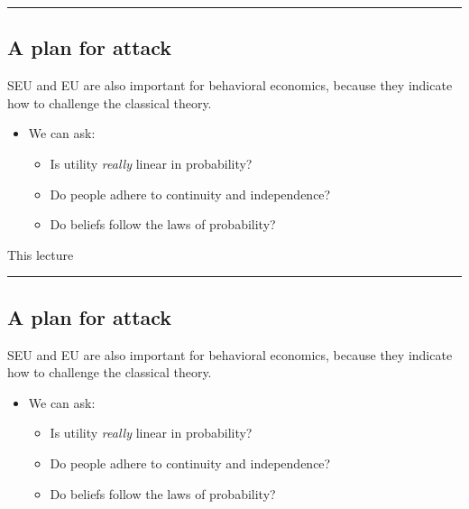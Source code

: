 \documentclass[
  letterpaper,
  DIV=11,
  numbers=noendperiod]{scrartcl}
\providecommand{\tightlist}{%
  \setlength{\itemsep}{0pt}\setlength{\parskip}{0pt}}\usepackage{longtable,booktabs,array}
\begin{document}
\begin{center}\rule{0.5\linewidth}{0.5pt}\end{center}

\subsection{A plan for attack}\label{a-plan-for-attack-1}

SEU and EU are also important for behavioral economics, because they
indicate how to challenge the classical theory.

\begin{itemize}
\tightlist
\item
  We can ask:

  \begin{itemize}
  \tightlist
  \item
    {Is utility \emph{really} linear in probability?}
  \item
    {Do people adhere to continuity and independence?}
  \item
    Do beliefs follow the laws of probability?
  \end{itemize}
\end{itemize}

{This lecture}

\begin{center}\rule{0.5\linewidth}{0.5pt}\end{center}

\subsection{A plan for attack}\label{a-plan-for-attack-2}

SEU and EU are also important for behavioral economics, because they
indicate how to challenge the classical theory.

\begin{itemize}
\tightlist
\item
  We can ask:

  \begin{itemize}
  \tightlist
  \item
    {Is utility \emph{really} linear in probability?}
  \item
    {Do people adhere to continuity and independence?}
  \item
    {Do beliefs follow the laws of probability?}
  \end{itemize}
\end{itemize}
\end{document}
